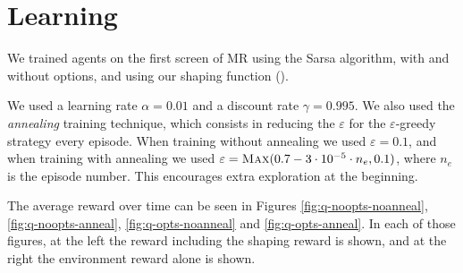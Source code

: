 %
%
%
%
%
%
%
%
%
%
%
%
%
%
%
%
%

\section{Learning}
We trained agents on the first screen of \acl{MR} using the Sarsa algorithm,
with and without options, and using our shaping function
().

We used a learning rate $\alpha=0.01$ and a discount rate $\gamma=0.995$. We
also used the \emph{annealing} training technique, which consists in reducing
the $\varepsilon$ for the $\varepsilon$-greedy strategy every episode. When
training without annealing we used $\varepsilon=0.1$, and when training with
annealing we used $\varepsilon=\textsc{Max}(0.7 - 3\cdot 10^{-5} \cdot n_e,
0.1)$, where $n_e$ is the episode number. This encourages extra exploration at
the beginning.

The average reward over time can be seen in Figures \ref{fig:q-noopts-noanneal},
\ref{fig:q-noopts-anneal}, \ref{fig:q-opts-noanneal} and
\ref{fig:q-opts-anneal}. In each of those figures, at the left the reward
including the shaping reward is shown, and at the right the environment reward
alone is shown.

